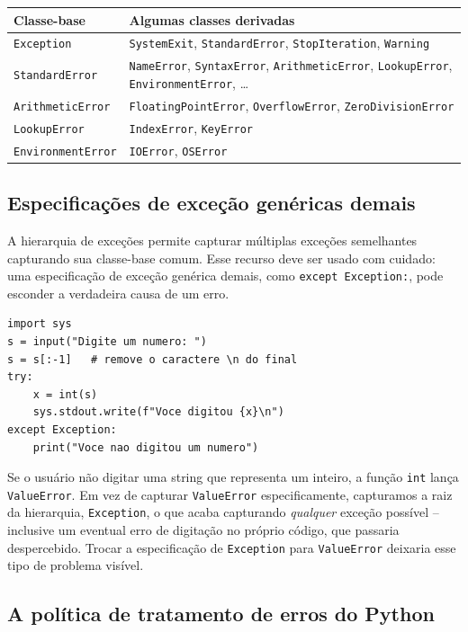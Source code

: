 \documentclass[11pt,a4paper]{article}
\begin{document}
\begin{center}
\small
\begin{tabular}{ll}
\toprule
\textbf{Classe-base} & \textbf{Algumas classes derivadas} \\
\midrule
\texttt{Exception} & \texttt{SystemExit}, \texttt{StandardError}, \texttt{StopIteration}, \texttt{Warning} \\
\texttt{StandardError} & \texttt{NameError}, \texttt{SyntaxError}, \texttt{ArithmeticError}, \texttt{LookupError}, \texttt{EnvironmentError}, \dots \\
\texttt{ArithmeticError} & \texttt{FloatingPointError}, \texttt{OverflowError}, \texttt{ZeroDivisionError} \\
\texttt{LookupError} & \texttt{IndexError}, \texttt{KeyError} \\
\texttt{EnvironmentError} & \texttt{IOError}, \texttt{OSError} \\
\bottomrule
\end{tabular}
\end{center}

\subsection{Especificações de exceção genéricas demais}

A hierarquia de exceções permite capturar múltiplas exceções semelhantes
capturando sua classe-base comum. Esse recurso deve ser usado com
cuidado: uma especificação de exceção genérica demais, como
\texttt{except Exception:}, pode esconder a verdadeira causa de um erro.

\begin{lstlisting}
import sys
s = input("Digite um numero: ")
s = s[:-1]   # remove o caractere \n do final
try:
    x = int(s)
    sys.stdout.write(f"Voce digitou {x}\n")
except Exception:
    print("Voce nao digitou um numero")
\end{lstlisting}

Se o usuário não digitar uma string que representa um inteiro, a função
\texttt{int} lança \texttt{ValueError}. Em vez de capturar
\texttt{ValueError} especificamente, capturamos a raiz da hierarquia,
\texttt{Exception}, o que acaba capturando \emph{qualquer} exceção
possível -- inclusive um eventual erro de digitação no próprio código,
que passaria despercebido. Trocar a especificação de \texttt{Exception}
para \texttt{ValueError} deixaria esse tipo de problema visível.

\subsection{A política de tratamento de erros do Python}
\end{document}
